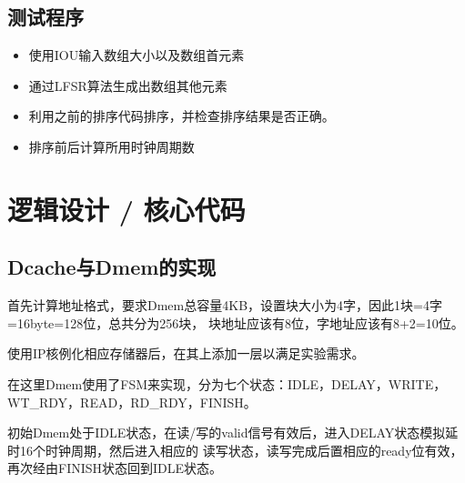 \documentclass[a4paper]{article}
\begin{document}
  \subsection{测试程序}
  \begin{itemize}
    \item 使用IOU输入数组大小以及数组首元素
    \item 通过LFSR算法生成出数组其他元素
    \item 利用之前的排序代码排序，并检查排序结果是否正确。
    \item 排序前后计算所用时钟周期数
  \end{itemize}
\section{逻辑设计 / 核心代码}
\subsection{Dcache与Dmem的实现}
首先计算地址格式，要求Dmem总容量4KB，设置块大小为4字，因此1块=4字=16byte=128位，总共分为256块，
块地址应该有8位，字地址应该有8+2=10位。

使用IP核例化相应存储器后，在其上添加一层以满足实验需求。

在这里Dmem使用了FSM来实现，分为七个状态：IDLE，DELAY，WRITE，WT\_RDY，READ，RD\_RDY，FINISH。

初始Dmem处于IDLE状态，在读/写的valid信号有效后，进入DELAY状态模拟延时16个时钟周期，然后进入相应的
读写状态，读写完成后置相应的ready位有效，再次经由FINISH状态回到IDLE状态。
\end{document}
